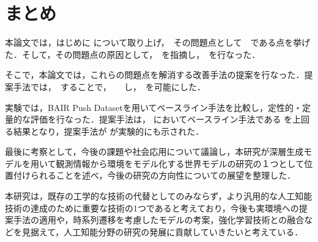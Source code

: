 \chapter{まとめ}
\label{chap:conclusion}

本論文では，はじめに について取り上げ，　その問題点として　である点を挙げた．そして，その問題点の原因として，　を指摘し，　を行なった．


そこで，本論文では，これらの問題点を解消する改善手法の提案を行なった．提案手法では，　することで，　　し，　を可能にした．

実験では，BAIR Push Datasetを用いてベースライン手法を比較し，定性的・定量的な評価を行なった．提案手法は， においてベースライン手法である を上回る結果となり，提案手法が が実験的にも示された．

最後に考察として，今後の課題や社会応用について議論し，本研究が深層生成モデルを用いて観測情報から環境をモデル化する世界モデルの研究の１つとして位置付けられることを述べ，今後の研究の方向性についての展望を整理した．

本研究は，既存の工学的な技術の代替としてのみならず，より汎用的な人工知能技術の達成のために重要な技術の1つであると考えており，今後も実環境への提案手法の適用や，時系列遷移を考慮したモデルの考案，強化学習技術との融合などを見据えて，人工知能分野の研究の発展に貢献していきたいと考えている．
